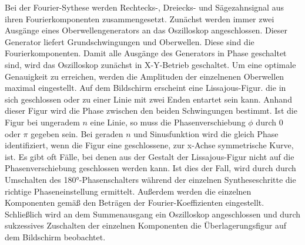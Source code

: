 Bei der Fourier-Sythese werden Rechtecks-, Dreiecks- und Sägezahnsignal 
aus ihren Fourierkomponenten zusammengesetzt. 
Zunächst werden immer zwei Ausgänge eines Oberwellengenerators an das 
Oszilloskop angeschlossen. Dieser Generator liefert Grundschwingungen 
und Oberwellen. Diese sind die Fourierkomponenten. Damit alle Ausgänge 
des Generators in Phase geschaltet sind, wird das Oszilloskop zunächst 
in X-Y-Betrieb geschaltet.
Um eine optimale Genauigkeit zu erreichen, werden die Amplituden der
einzelnenen Oberwellen maximal eingestellt. 
Auf dem Bildschirm erscheint eine Lissajous-Figur. die in sich geschlossen 
oder zu einer Linie mit zwei Enden entartet sein kann. Anhand dieser 
Figur wird die Phase zwischen den beiden Schwingungen bestimmt. Ist die
Figur bei ungeradem $n$ eine Linie, so muss die Phasenverschiebung $\phi$ 
durch 0 oder $\pi$ gegeben sein. Bei geraden $n$ und Sinusfunktion wird
die gleich Phase identifiziert, wenn die Figur eine geschlossene, zur 
x-Achse symmetrische Kurve, ist. Es gibt oft Fälle, bei denen aus der
Gestalt der Lissajous-Figur nicht auf die Phasenverschiebung geschlossen 
werden kann. Ist dies der Fall, wird durch durch Umschalten des 180°-Phasenschalters
während der einzelnen Syntheseschritte die richtige Phaseneinstellung ermittelt. 
Außerdem werden die einzelnen Komponenten gemäß den Beträgen der Fourier-Koeffizienten
eingestellt. Schließlich wird an dem Summenausgang ein Oszilloskop 
angeschlossen und durch sukzessives Zuschalten der einzelnen Komponenten 
die Überlagerungsfigur auf dem Bildschirm beobachtet. 
